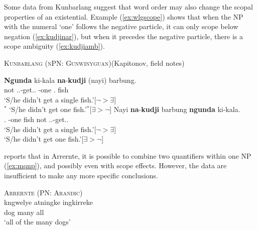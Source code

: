 \documentclass[12pt,egregdoesnotlikesansseriftitles]{scrartcl}
\begin{document}
Some data from Kunbarlang  suggest that word  order may also change the scopal properties of an existential. Example (\ref{ex:wlgscope}) shows that when the NP with the numeral `one' follows the negative particle, it can only scope below negation (\ref{ex:kudjinar}), but when it precedes the negative particle, there is a scope ambiguity (\ref{ex:kudjiamb}).
\begin{exe}
  \ex\label{ex:wlgscope} \textsc{Kunbarlang (nPN: Gunwinyguan)}\hfill (Kapitonov, field notes) %
  \begin{xlist}
    \ex\label{ex:kudjinar} \gll \textbf{Ngunda} ki-kala \textbf{na}-\textbf{kudji} (nayi) barbung.\\
    not \Tsg.\Irr.\Pst-get.\Irr.\Pst{} \Cli-one \phantom{(}\Nm.\Cli{} fish\\
    \glt `S/he didn't get a single fish.'\hfill [$\neg > \exists$]\\
    $^*$ `S/he didn't get one fish.'\hfill $^*$[$\exists > \neg$]
    \ex\label{ex:kudjiamb} \gll Nayi \textbf{na}-\textbf{kudji} barbung \textbf{ngunda} ki-kala.\\
    \Nm.\Cli{} \Cli-one fish not \Tsg.\Irr.\Pst-get.\Irr.\Pst\\
    \glt `S/he didn't get a single fish.'\hfill [$\neg > \exists$]\\
    `S/he didn't get one fish.'\hfill [$\exists > \neg$]
  \end{xlist}
\end{exe}


 reports that in Arrernte, it is possible to combine two quantifiers within one NP (\ref{ex:mqnp}), and possibly even with scope effects. However, the data are insufficient to make any more specific conclusions.
\begin{exe}
  \ex\label{ex:mqnp} \textsc{Arrernte (PN: Arandic)} \hfill {}\\
  \gll kngwelye atningke ingkirreke\\
  dog many all\\
  \glt `all of the many dogs'
\end{exe}
\end{document}
